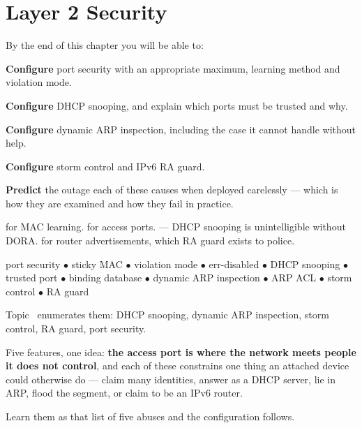 \chapter{Layer 2 Security}\label{ch:l2security}

\begin{outcomes}
By the end of this chapter you will be able to:
\begin{tight}
  \item \textbf{Configure} port security with an appropriate maximum, learning
        method and violation mode.
  \item \textbf{Configure} DHCP snooping, and explain which ports must be trusted
        and why.
  \item \textbf{Configure} dynamic ARP inspection, including the case it cannot
        handle without help.
  \item \textbf{Configure} storm control and IPv6 RA guard.
  \item \textbf{Predict} the outage each of these causes when deployed carelessly
        --- which is how they are examined and how they fail in practice.
\end{tight}
\end{outcomes}

\begin{prereq}
 for MAC learning.  for access ports.
 --- DHCP snooping is unintelligible without DORA.  for
router advertisements, which RA guard exists to police.
\end{prereq}

\begin{keyterms}
port security $\bullet$ sticky MAC $\bullet$ violation mode $\bullet$
err-disabled $\bullet$ DHCP snooping $\bullet$ trusted port $\bullet$ binding
database $\bullet$ dynamic ARP inspection $\bullet$ ARP ACL $\bullet$ storm
control $\bullet$ RA guard
\end{keyterms}

\begin{examnote}
Topic~ enumerates them:  DHCP snooping,  dynamic ARP
inspection,  storm control,  RA guard,  port
security.

Five features, one idea: \textbf{the access port is where the network meets
people it does not control}, and each of these constrains one thing an attached
device could otherwise do --- claim many identities, answer as a DHCP server, lie
in ARP, flood the segment, or claim to be an IPv6 router.

Learn them as that list of five abuses and the configuration follows.
\end{examnote}

